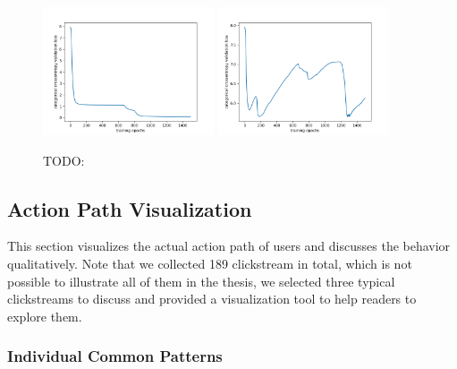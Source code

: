 \begin{figure}[H]
    \centering
    \includegraphics[width=0.45\textwidth]{figures/loss1}
    \includegraphics[width=0.45\textwidth]{figures/loss2}
    \caption{TODO:}
    \label{fig:loss}
\end{figure}


\subsection{Action Path Visualization}

This section visualizes the actual action path of users and discusses the behavior qualitatively.
Note that we collected 189 clickstream in total, which is not possible to illustrate all of them
in the thesis, we selected three typical clickstreams to discuss and provided a visualization tool
to help readers to explore them.

\subsubsection{Individual Common Patterns}

